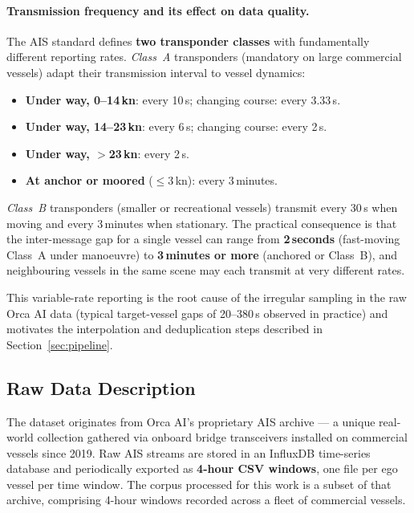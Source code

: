 \documentclass[12pt, a4paper]{article}
\begin{document}
  \paragraph{Transmission frequency and its effect on data quality.}
  The AIS standard defines \textbf{two transponder classes} with fundamentally different
  reporting rates.  \textit{Class~A} transponders (mandatory on large commercial vessels)
  adapt their transmission interval to vessel dynamics:

  \begin{itemize}
      \item \textbf{Under way, 0--14\,kn}: every 10\,s; changing course: every 3.33\,s.
      \item \textbf{Under way, 14--23\,kn}: every 6\,s; changing course: every 2\,s.
      \item \textbf{Under way, $>$23\,kn}: every 2\,s.
      \item \textbf{At anchor or moored} ($\leq$3\,kn): every 3\,minutes.
  \end{itemize}

  \textit{Class~B} transponders (smaller or recreational vessels) transmit every 30\,s
  when moving and every 3\,minutes when stationary.  The practical consequence is that
  the inter-message gap for a single vessel can range from \textbf{2\,seconds}
  (fast-moving Class~A under manoeuvre) to \textbf{3\,minutes or more}
  (anchored or Class~B), and neighbouring vessels in the same scene may each transmit at
  very different rates.

  This variable-rate reporting is the root cause of the irregular sampling in the raw
  Orca AI data (typical target-vessel gaps of 20--380\,s observed in practice) and
  motivates the interpolation and deduplication steps described in
  Section~\ref{sec:pipeline}.

  \subsection{Raw Data Description}

  The dataset originates from Orca AI's proprietary AIS archive --- a unique real-world collection
  gathered via onboard bridge transceivers installed on commercial vessels since 2019.
  Raw AIS streams are stored in an InfluxDB time-series database and periodically exported as
  \textbf{4-hour CSV windows}, one file per ego vessel per time window.  The corpus processed
  for this work is a subset of that archive, comprising 4-hour windows recorded
  across a fleet of commercial vessels.
\end{document}

